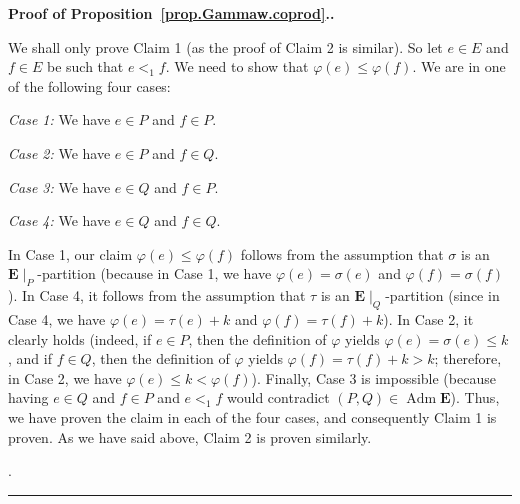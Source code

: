 \documentclass[numbers=enddot,12pt,final,onecolumn,notitlepage,abstracton]{scrartcl}
\theoremstyle{definition}
\newenvironment{proof}[1][Proof]{\noindent\textbf{#1.} }{\ \rule{0.5em}{0.5em}}
\newenvironment{vershort}{}{}
\newcommand{\Adm}{\operatorname{Adm}}
\newcommand{\EE}{{\mathbf{E}}}
\begin{document}
\begin{vershort}
\begin{proof}[Proof of Proposition~\ref{prop.Gammaw.coprod}.]
{We shall only prove Claim 1 (as the proof of Claim 2 is
similar). So let $e \in E$ and $f \in E$ be such that
$e <_1 f$. We need to show that
$\varphi\left(e\right) \leq \varphi\left(f\right)$.
We are in one of the following four cases:

\textit{Case 1:} We have $e \in P$ and $f \in P$.

\textit{Case 2:} We have $e \in P$ and $f \in Q$.

\textit{Case 3:} We have $e \in Q$ and $f \in P$.

\textit{Case 4:} We have $e \in Q$ and $f \in Q$.

In Case 1, our claim
$\varphi\left(e\right) \leq \varphi\left(f\right)$ follows
from the assumption that $\sigma$ is an
$\EE\mid_P$-partition (because in Case 1,
we have $\varphi\left(e\right) = \sigma\left(e\right)$
and $\varphi\left(f\right) = \sigma\left(f\right)$).
In Case 4, it follows from the
assumption that $\tau$ is an $\EE\mid_Q$-partition
(since in Case 4, we have
$\varphi\left(e\right) = \tau\left(e\right) + k$ and
$\varphi\left(f\right) = \tau\left(f\right) + k$). In
Case 2, it clearly holds (indeed,
if $e \in P$, then the definition of $\varphi$ yields
$\varphi\left(e\right) = \sigma\left(e\right) \leq k$,
and if $f \in Q$, then
the definition of $\varphi$ yields
$\varphi\left(f\right) = \tau\left(f\right) + k > k$;
therefore, in Case 2, we have
$\varphi\left(e\right) \leq k < \varphi\left(f\right)$).
Finally, Case 3 is impossible (because having $e \in Q$
and $f \in P$ and $e <_1 f$ would contradict
$\left(P, Q\right) \in \Adm \EE$). Thus, we have proven the
claim in each of the four cases, and consequently Claim 1 is
proven. As we have said above, Claim 2 is proven similarly.}.
\end{proof}
\end{vershort}
\end{document}
